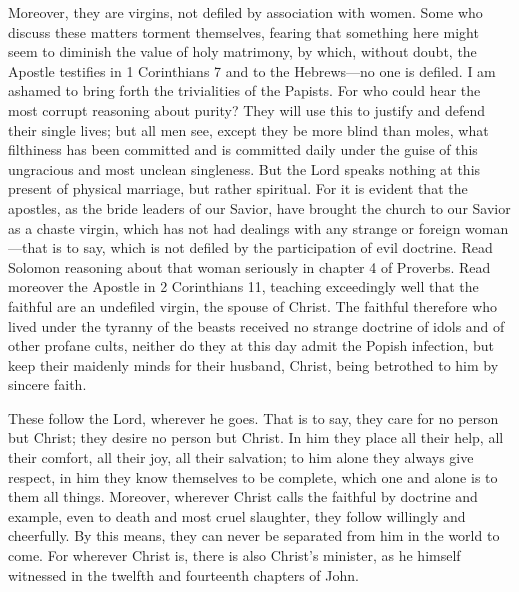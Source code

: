 Moreover, they are virgins, not defiled by association with women. Some who discuss these matters torment themselves, fearing that something here might seem to diminish the value of holy matrimony, by which, without doubt, the Apostle testifies in 1 Corinthians 7 and to the Hebrews—no one is defiled. I am ashamed to bring forth the trivialities of the Papists. For who could hear the most corrupt reasoning about purity? They will use this to justify and defend their single lives; but all men see, except they be more blind than moles, what filthiness has been committed and is committed daily under the guise of this ungracious and most unclean singleness. But the Lord speaks nothing at this present of physical marriage, but rather spiritual. For it is evident that the apostles, as the bride leaders of our Savior, have brought the church to our Savior as a chaste virgin, which has not had dealings with any strange or foreign woman—that is to say, which is not defiled by the participation of evil doctrine. Read Solomon reasoning about that woman seriously in chapter 4 of Proverbs. Read moreover the Apostle in 2 Corinthians 11, teaching exceedingly well that the faithful are an undefiled virgin, the spouse of Christ. The faithful therefore who lived under the tyranny of the beasts received no strange doctrine of idols and of other profane cults, neither do they at this day admit the Popish infection, but keep their maidenly minds for their husband, Christ, being betrothed to him by sincere faith.

These follow the Lord, wherever he goes. That is to say, they care for no person but Christ; they desire no person but Christ. In him they place all their help, all their comfort, all their joy, all their salvation; to him alone they always give respect, in him they know themselves to be complete, which one and alone is to them all things. Moreover, wherever Christ calls the faithful by doctrine and example, even to death and most cruel slaughter, they follow willingly and cheerfully. By this means, they can never be separated from him in the world to come. For wherever Christ is, there is also Christ’s minister, as he himself witnessed in the twelfth and fourteenth chapters of John.

